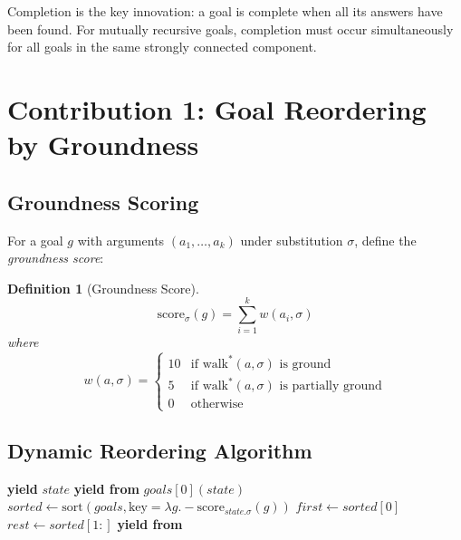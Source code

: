 \documentclass[11pt,a4paper]{article}
\newtheorem{definition}[theorem]{Definition}
\begin{document}
Completion is the key innovation: a goal is complete when all its answers
have been found. For mutually recursive goals, completion must occur
simultaneously for all goals in the same strongly connected component.

\section{Contribution 1: Goal Reordering by Groundness}
\label{sec:reordering_chirho}

\subsection{Groundness Scoring}
\label{subsec:scoring_chirho}

For a goal $g$ with arguments $(a_1, \ldots, a_k)$ under substitution $\sigma$,
define the \emph{groundness score}:

\begin{definition}[Groundness Score]
\label{def:groundness_chirho}
\[
\text{score}_\sigma(g) = \sum_{i=1}^{k} w(a_i, \sigma)
\]
where
\[
w(a, \sigma) = \begin{cases}
  10 & \text{if } \text{walk}^*(a, \sigma) \text{ is ground} \\
  5  & \text{if } \text{walk}^*(a, \sigma) \text{ is partially ground} \\
  0  & \text{otherwise}
\end{cases}
\]
\end{definition}

\subsection{Dynamic Reordering Algorithm}
\label{subsec:algorithm_chirho}

\begin{algorithm}
\caption{Smart Conjunction (\texttt{smart\_conj\_chirho})}
\label{alg:smart_conj_chirho}
\begin{algorithmic}[1]
    \State \textbf{yield} $state$
    \State \textbf{yield from} $goals[0](state)$
  \Else
    \State $sorted \gets \text{sort}(goals, \text{key}=\lambda g. -\text{score}_{state.\sigma}(g))$
    \State $first \gets sorted[0]$
    \State $rest \gets sorted[1:]$
      \State \textbf{yield from} 
    \EndFor
  \EndIf
\EndProcedure
\end{algorithmic}
\end{algorithm}
\end{document}
